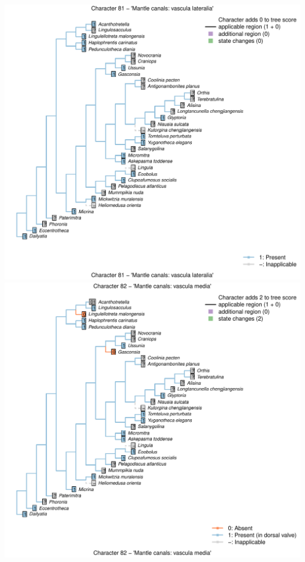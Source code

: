 \documentclass[]{book}
\theoremstyle{definition}
\theoremstyle{definition}
\theoremstyle{definition}
\theoremstyle{remark}
\begin{document}
\includegraphics{Brachiopod_phylogeny_files/figure-latex/unnamed-chunk-4-81.pdf}
\includegraphics{Brachiopod_phylogeny_files/figure-latex/unnamed-chunk-4-82.pdf}
\end{document}
